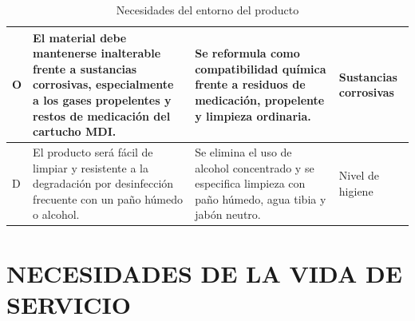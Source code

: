 \documentclass[11pt,a4paper]{article}
\begin{document}
\begin{table}[H]
\begin{tabular}{|p{2.8cm}|p{5.5cm}|p{2.5cm}|p{3.0cm}|}
\hline
O & El material debe mantenerse inalterable frente a sustancias corrosivas, especialmente a los gases propelentes y restos de medicación del cartucho MDI. & Se reformula como compatibilidad química frente a residuos de medicación, propelente y limpieza ordinaria. & Sustancias corrosivas \\
\hline
D & El producto será fácil de limpiar y resistente a la degradación por desinfección frecuente con un paño húmedo o alcohol. & Se elimina el uso de alcohol concentrado y se especifica limpieza con paño húmedo, agua tibia y jabón neutro. & Nivel de higiene \\
\hline
\end{tabular}
\caption{Necesidades del entorno del producto}
\end{table}

\newpage

\section{NECESIDADES DE LA VIDA DE SERVICIO}

\vspace{0.5cm}
\end{document}
